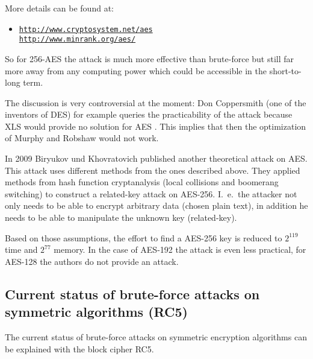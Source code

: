 More details can be found at:
\vspace{-10pt}
\begin{itemize}
  \item[] \href{http://www.cryptosystem.net/aes}
               {\texttt{http://www.cryptosystem.net/aes}}\\
          \href{http://www.minrank.org/aes/}
               {\texttt{http://www.minrank.org/aes/}}
\end{itemize}

So for 256-AES the attack is much more effective than brute-force but still far more away from any computing power which could be accessible in the short-to-long term. 

The discussion is very controversial at the moment: Don Coppersmith (one of the
inventors of DES) for example queries the practicability of the attack because
XLS would provide no solution for AES \cite{cm:Coppersmith2002}. This implies that
then the optimization of Murphy and Robshaw \cite{cm:Robshaw2002b} would not work.

In 2009 Biryukov und Khovratovich \cite{cm:Biryukov2009} published another
theoretical attack on AES. This attack uses different methods from the ones
described above. They applied methods from hash function cryptanalysis (local
collisions and boomerang switching) to construct a related-key attack on
AES-256. I.~e.\ the attacker not only needs to be able to encrypt arbitrary data
(chosen plain text), in addition he needs to be able to manipulate the unknown key
(related-key). 

Based on those assumptions, the effort to find a AES-256 key is reduced to
$2^{119}$ time and $2^{77}$ memory. In the case of AES-192 the attack is even less
practical, for AES-128 the authors do not provide an attack.

\subsection{Current status of brute-force attacks on
symmetric algorithms (RC5)}
\label{Brute-force-gegen-Symmetr}

The current status of brute-force attacks on symmetric encryption algorithms can be explained with the block cipher RC5.

